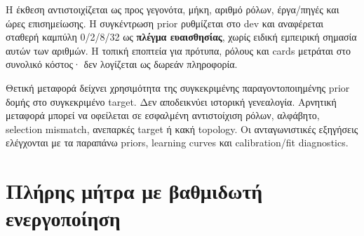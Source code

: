 \documentclass[
  10pt,
  a4paper,
]{report}
\begin{document}
Η έκθεση αντιστοιχίζεται ως προς γεγονότα, μήκη, αριθμό ρόλων,
έργα/πηγές και ώρες επισημείωσης. Η συγκέντρωση prior ρυθμίζεται στο dev
και αναφέρεται σταθερή καμπύλη 0/2/8/32 ως \textbf{πλέγμα ευαισθησίας},
χωρίς ειδική εμπειρική σημασία αυτών των αριθμών. Η τοπική εποπτεία για
πρότυπα, ρόλους και cards μετράται στο συνολικό κόστος· δεν λογίζεται ως
δωρεάν πληροφορία.

Θετική μεταφορά δείχνει χρησιμότητα της συγκεκριμένης παραγοντοποιημένης
prior δομής στο συγκεκριμένο target. Δεν αποδεικνύει ιστορική
γενεαλογία. Αρνητική μεταφορά μπορεί να οφείλεται σε εσφαλμένη
αντιστοίχιση ρόλων, αλφάβητο, selection mismatch, ανεπαρκές target ή
κακή topology. Οι ανταγωνιστικές εξηγήσεις ελέγχονται με τα παραπάνω
priors, learning curves και calibration/fit diagnostics.

\section{Πλήρης μήτρα με βαθμιδωτή
ενεργοποίηση}\label{ux3c0ux3bbux3aeux3c1ux3b7ux3c2-ux3bcux3aeux3c4ux3c1ux3b1-ux3bcux3b5-ux3b2ux3b1ux3b8ux3bcux3b9ux3b4ux3c9ux3c4ux3ae-ux3b5ux3bdux3b5ux3c1ux3b3ux3bfux3c0ux3bfux3afux3b7ux3c3ux3b7}
\end{document}
